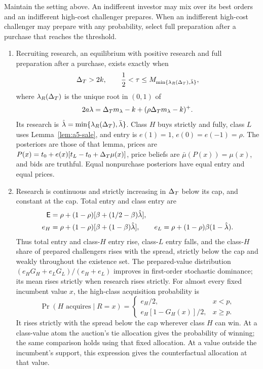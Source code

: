 \setcounter{proposition}{3}
\begin{proposition}\label{prop:research}
Maintain the setting above. An indifferent investor may mix over its best orders and an indifferent high-cost
challenger prepares. When an indifferent high-cost challenger may prepare with any probability, select full
preparation after a purchase that reaches the threshold.
\begin{enumerate}[label=(\alph*),leftmargin=2em]
\item Recruiting research, an equilibrium with positive research and full preparation after a purchase, exists
exactly when
\begin{equation}\label{eq:research-exist}
 \Delta_T>2k,\qquad \frac12<\tau\le M_{\min\{\lambda_R(\Delta_T),\bar\lambda\}},
\end{equation}
where \(\lambda_R(\Delta_T)\) is the unique root in \((0,1)\) of
\begin{equation}\label{eq:research-im}
 2a\lambda=\Delta_T m_\lambda-k+(\rho\Delta_T m_\lambda-k)^+.
\end{equation}
Its research is \(\hat\lambda=\min\{\lambda_R(\Delta_T),\bar\lambda\}\). Class \(H\) buys strictly and fully, class \(L\)
uses Lemma~\ref{lem:a5-sale}, and entry is \(e(1)=1\), \(e(0)=e(-1)=\rho\). The posteriors are those of that
lemma, prices are \(P(x)=t_0+e(x)[t_L-t_0+\Delta_T\mu(x)]\), price beliefs are
\(\bar\mu(P(x))=\mu(x)\), and bids are truthful. Equal nonpurchase posteriors have equal entry and equal prices.

\item Research is continuous and strictly increasing in \(\Delta_T\) below its cap, and constant at the cap.
Total entry and class entry are
\begin{align*}
 \mathsf{E}&=\rho+(1-\rho)[\beta+(1/2-\beta)\hat\lambda],\\
 e_H&=\rho+(1-\rho)[\beta+(1-\beta)\hat\lambda],\qquad
 e_L=\rho+(1-\rho)\beta(1-\hat\lambda).
\end{align*}
Thus total entry and class-\(H\) entry rise, class-\(L\) entry falls, and the class-\(H\) share of prepared
challengers rises with the spread, strictly below the cap and weakly throughout the existence set.
The prepared-value distribution
\((e_HG_H+e_LG_L)/(e_H+e_L)\) improves in first-order stochastic dominance; its mean rises strictly when research
rises strictly. For almost every fixed incumbent value \(x\), the high-class acquisition probability is
\[
 \Pr(H\text{ acquires}\mid R=x)=
 \begin{cases}e_H/2,&x<p,\\ e_H[1-G_H(x)]/2,&x\ge p.\end{cases}
\]
It rises strictly with the spread below the cap wherever class \(H\) can win. At a class-value atom the auction's
tie allocation gives the probability of winning; the same comparison holds using that fixed allocation.
At a value outside the incumbent's support, this expression gives the counterfactual allocation at that value.


\end{enumerate}
\end{proposition}

